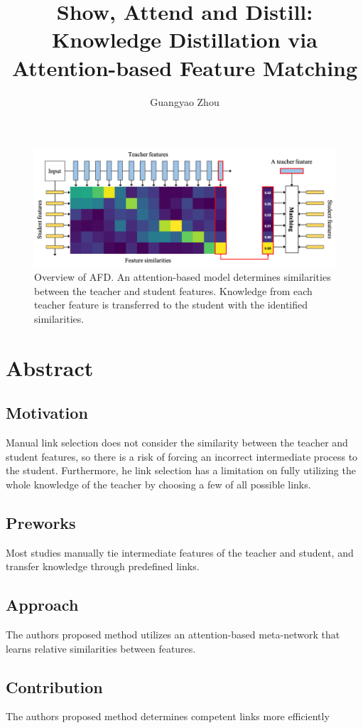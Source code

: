 \documentclass{article}
\author{Guangyao Zhou}
\title{Show, Attend and Distill: Knowledge Distillation via Attention-based Feature Matching}
\begin{document}
	
	\maketitle
	\begin{figure}[t]
		\centering
		\includegraphics[width=\columnwidth]{figure/Figure1_sr.png}
		\caption{Overview of AFD. An attention-based model determines similarities between the teacher and student features. Knowledge from each teacher feature is transferred to the student with the identified similarities.}
		\label{fig:overview}
	\end{figure}
	\section{Abstract}
	\subsection{Motivation}
	Manual link selection does not consider the similarity between the teacher and student features, so there is a risk of forcing an incorrect intermediate process to the student. Furthermore, he link selection has a limitation on fully utilizing the whole knowledge of the teacher by choosing a few of all possible links.
	\subsection{Preworks}
	Most studies manually tie intermediate features of the teacher and student, and transfer knowledge through predefined links.
	\subsection{Approach}
	The authors proposed method utilizes an attention-based meta-network that learns relative similarities between features.
	\subsection{Contribution}
	The authors proposed method determines competent links more efficiently
\end{document}
